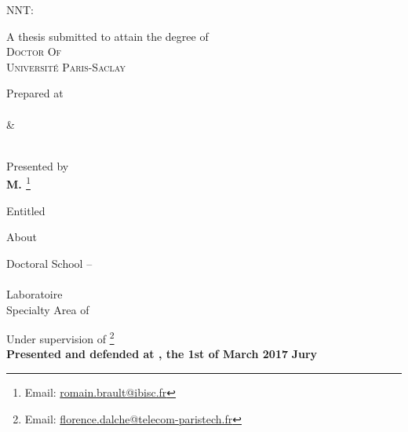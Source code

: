 \begin{titlepage}
\begin{addmargin}[-1cm]{-3cm}
\vspace{2cm}
NNT: \NNT

\vspace{-.5cm}

\begin{center}
\large

\hfill

\begingroup
{A thesis submitted to attain the degree of} \\
{\Huge \color{PSaclay}\textsc{Doctor Of} \\ \textsc{Universit\'e Paris-Saclay}}
\endgroup

\vspace{.5cm}
\begingroup
Prepared at \\
{\Huge \color{PSaclay}\textsc{\myUniUEVE}} \\
{\LARGE \&} \\
{\Huge \color{PSaclay}\textsc{\myUniTP}} \\
\endgroup

\vspace{.5cm}
\begingroup
Presented by \\
{\Large\textbf{M. \textsc{\myName}}}\footnote{Email: \href{mailto:romain.brault@ibisc.fr}{romain.brault@ibisc.fr}} %
\endgroup

\bigskip
\vfill

\begingroup
Entitled \\
\smallskip
{\Huge \color{PSaclay}\textsc{\myTitle}} %
\endgroup

\bigskip
\vfill

\begingroup
About \\
{\Large \textbf{\textsc{\mySubtitle}}} %
\endgroup

\bigskip
\vfill

\begingroup
Doctoral School -- \EDN \\
\myDoctoralSchool \\
Laboratoire \myFaculty \\
Specialty Area of \myDepartment
\medskip

\endgroup
\end{center}

\vspace{1cm}
\vfill

\noindent Under supervision of \mySupervisorDegree \textsc{\mySupervisor}\footnote{Email: \href{mailto:florence.dalche@telecom-paristech.fr}{florence.dalche@telecom-paristech.fr}} \\
\smallskip
\noindent \textbf{Presented and defended at \myUniUEVE, the 1st of March 2017}
\smallskip
\noindent \textbf{Jury}

\end{addmargin}
\end{titlepage}
